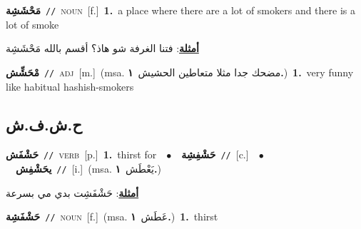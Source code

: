 \documentclass[10pt,a4paper,twoside]{article} %
\begin{document}
\begin{multicols}{2}
{\setlength\topsep{0pt}\textbf{\foreignlanguage{arabic}{مَحْشَشِة}}\ {\color{gray}\texttt{//}\color{black}}\ \textsc{noun}\ [f.]\ \textbf{1.}~a place where there are a lot of smokers and there is a lot of smoke\  \begin{flushright}\color{gray}\foreignlanguage{arabic}{\textbf{\underline{\foreignlanguage{arabic}{أمثلة}}}: فتنا الغرفة شو هاذ؟ أقسم بالله مَحْشَشِة}\end{flushright}\color{black}} \vspace{2mm}

{\setlength\topsep{0pt}\textbf{\foreignlanguage{arabic}{مْحَشِّش}}\ {\color{gray}\texttt{//}\color{black}}\ \textsc{adj}\ [m.]\ \color{gray}(msa. \foreignlanguage{arabic}{مضحك جدا مثلا متعاطين الحشيش}~\foreignlanguage{arabic}{\textbf{١.}})\color{black}\ \textbf{1.}~very funny like habitual hashish-smokers\ } \vspace{2mm}

\vspace{-3mm}
\subsection*{\color{blue}\foreignlanguage{arabic}{ح.ش.ف.ش}\color{blue}{}} 

{\setlength\topsep{0pt}\textbf{\foreignlanguage{arabic}{حَشْفَش}}\ {\color{gray}\texttt{//}\color{black}}\ \textsc{verb}\ [p.]\ \textbf{1.}~thirst for\ \ $\bullet$\ \ \setlength\topsep{0pt}\textbf{\foreignlanguage{arabic}{حَشْفِشِة}}\ {\color{gray}\texttt{//}\color{black}}\ [c.]\ \ $\bullet$\ \ \setlength\topsep{0pt}\textbf{\foreignlanguage{arabic}{يحَشْفِش}}\ {\color{gray}\texttt{//}\color{black}}\ [i.]\ \color{gray}(msa. \foreignlanguage{arabic}{يَعْطَش}~\foreignlanguage{arabic}{\textbf{١.}})\color{black}\  \begin{flushright}\color{gray}\foreignlanguage{arabic}{\textbf{\underline{\foreignlanguage{arabic}{أمثلة}}}: حَشْفَشِت بدي مي بسرعة}\end{flushright}\color{black}} \vspace{2mm}

{\setlength\topsep{0pt}\textbf{\foreignlanguage{arabic}{حَشْفَشِة}}\ {\color{gray}\texttt{//}\color{black}}\ \textsc{noun}\ [f.]\ \color{gray}(msa. \foreignlanguage{arabic}{عَطَش}~\foreignlanguage{arabic}{\textbf{١.}})\color{black}\ \textbf{1.}~thirst\ } \vspace{2mm}


\end{multicols}
\end{document}
